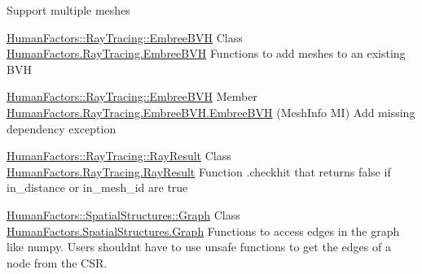 Support multiple meshes 

\mbox{\hyperlink{class_human_factors_1_1_ray_tracing_1_1_embree_b_v_h}{Human\+Factors\+::\+Ray\+Tracing\+::\+Embree\+B\+VH}} Class \mbox{\hyperlink{class_human_factors_1_1_ray_tracing_1_1_embree_b_v_h}{Human\+Factors.Ray\+Tracing.Embree\+B\+VH}}  \label{todo__todo000007}%
%
 Functions to add meshes to an existing B\+VH 

\mbox{\hyperlink{class_human_factors_1_1_ray_tracing_1_1_embree_b_v_h}{Human\+Factors\+::\+Ray\+Tracing\+::\+Embree\+B\+VH}} Member \mbox{\hyperlink{class_human_factors_1_1_ray_tracing_1_1_embree_b_v_h_abe609aebad5a2369ad13c891eb1802f4}{Human\+Factors.Ray\+Tracing.Embree\+B\+VH.Embree\+B\+VH}} (Mesh\+Info MI) \label{todo__todo000008}%
%
Add missing dependency exception 

\mbox{\hyperlink{struct_human_factors_1_1_ray_tracing_1_1_ray_result}{Human\+Factors\+::\+Ray\+Tracing\+::\+Ray\+Result}} Class \mbox{\hyperlink{struct_human_factors_1_1_ray_tracing_1_1_ray_result}{Human\+Factors.Ray\+Tracing.Ray\+Result}}  \label{todo__todo000009}%
%
Function .checkhit that returns false if in\+\_\+distance or in\+\_\+mesh\+\_\+id are true  

\mbox{\hyperlink{class_human_factors_1_1_spatial_structures_1_1_graph}{Human\+Factors\+::\+Spatial\+Structures\+::\+Graph}} Class \mbox{\hyperlink{class_human_factors_1_1_spatial_structures_1_1_graph}{Human\+Factors.Spatial\+Structures.Graph}}  \label{todo__todo000010}%
%
Functions to access edges in the graph like numpy. Users shouldn\textquotesingle{}t have to use unsafe functions to get the edges of a node from the C\+SR. 